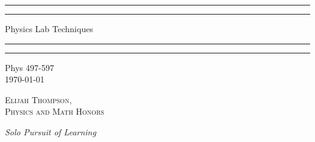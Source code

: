 \documentclass[12pt, a4paper, oneside, openright, titlepage]{book}
\begin{document}

\begin{titlepage}
    \centering
    \scshape
    \vspace*{\baselineskip}
    \rule{\textwidth}{1.6pt}\vspace*{-\baselineskip}\vspace*{2pt}
    \rule{\textwidth}{0.4pt}
    
    \vspace{0.75\baselineskip}
    
    {\LARGE Physics Lab Techniques}
    
    \vspace{0.75\baselineskip}
    
    \rule{\textwidth}{0.4pt}\vspace*{-\baselineskip}\vspace{3.2pt}
    \rule{\textwidth}{1.6pt}
    
    \vspace{2\baselineskip}
    Phys 497-597 \\
    \vspace*{3\baselineskip}
    \monthdayyeardate\today \\
    \vspace*{5.0\baselineskip}
    
    {\scshape\Large Elijah Thompson, \\ Physics and Math Honors\\}
    
    \vspace{1.0\baselineskip}
    \textit{Solo Pursuit of Learning}
    \vfill
    \enlargethispage{1in}
    \begin{figure}[b!]
    \end{figure}
\end{titlepage}
\end{document}
